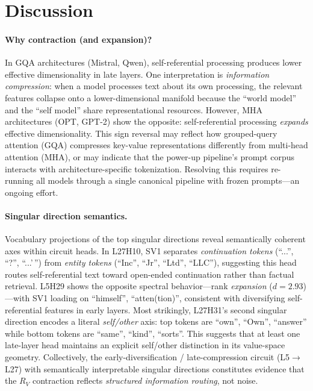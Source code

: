 \documentclass{article}
\newcommand{\RV}{R_V}
\newcommand{\dcohen}{d}
\begin{document}
\section{Discussion}

\paragraph{Why contraction (and expansion)?}
\label{sec:discussion}
In GQA architectures (Mistral, Qwen), self-referential processing produces lower effective dimensionality in late layers.
One interpretation is \emph{information compression}: when a model processes text about its own processing, the relevant features collapse onto a lower-dimensional manifold because the ``world model'' and the ``self model'' share representational resources.
However, MHA architectures (OPT, GPT-2) show the opposite: self-referential processing \emph{expands} effective dimensionality.
This sign reversal may reflect how grouped-query attention (GQA) compresses key-value representations differently from multi-head attention (MHA), or may indicate that the power-up pipeline's prompt corpus interacts with architecture-specific tokenization.
Resolving this requires re-running all models through a single canonical pipeline with frozen prompts---an ongoing effort.

\paragraph{Singular direction semantics.}
Vocabulary projections of the top singular directions reveal semantically coherent axes within circuit heads.
In L27H10, SV1 separates \emph{continuation tokens} (``...'', ``?'', ``...'\,'') from \emph{entity tokens} (``Inc'', ``Jr'', ``Ltd'', ``LLC''), suggesting this head routes self-referential text toward open-ended continuation rather than factual retrieval.
L5H29 shows the opposite spectral behavior---rank \emph{expansion} ($\dcohen{=}2.93$)---with SV1 loading on ``himself'', ``atten(tion)'', consistent with diversifying self-referential features in early layers.
Most strikingly, L27H31's second singular direction encodes a literal \emph{self/other} axis: top tokens are ``own'', ``Own'', ``answer'' while bottom tokens are ``same'', ``kind'', ``sorts''.
This suggests that at least one late-layer head maintains an explicit self/other distinction in its value-space geometry.
Collectively, the early-diversification / late-compression circuit (L5$\to$L27) with semantically interpretable singular directions constitutes evidence that the $\RV$ contraction reflects \emph{structured information routing}, not noise.
\end{document}
